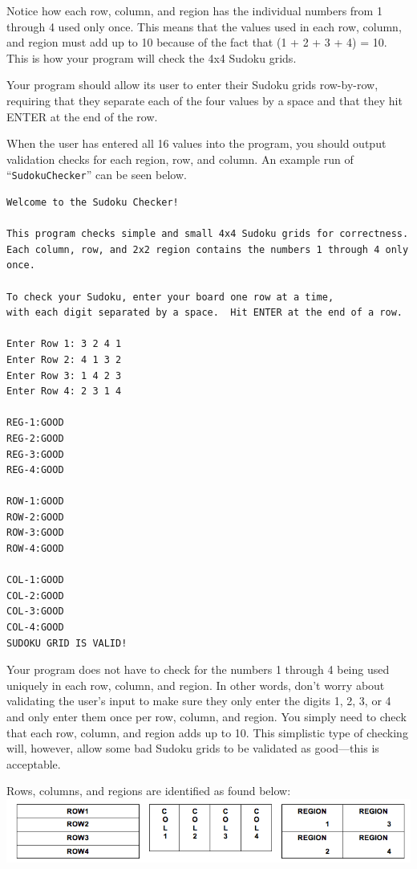 \noindent Notice how each row, column, and region has the individual numbers from 1 through 4 used only once.  This means
that the values used in each row, column, and region must add up to 10 because of the fact that (1 + 2 + 3 + 4) = 10.  This is
how your program will check the 4x4 Sudoku grids.

\noindent Your program should allow its user to enter their Sudoku grids row-by-row, requiring that they separate each
of the four values by a space and that they hit ENTER at the end of the row.

\noindent When the user has entered all 16 values into the program, you should output validation checks for each region,
row, and column.  An example run of ``{\tt SudokuChecker}'' can be seen below.

\vspace*{-.15in}

\begin{verbatim}
Welcome to the Sudoku Checker!

This program checks simple and small 4x4 Sudoku grids for correctness.
Each column, row, and 2x2 region contains the numbers 1 through 4 only once.

To check your Sudoku, enter your board one row at a time,
with each digit separated by a space.  Hit ENTER at the end of a row.

Enter Row 1: 3 2 4 1
Enter Row 2: 4 1 3 2
Enter Row 3: 1 4 2 3
Enter Row 4: 2 3 1 4

REG-1:GOOD
REG-2:GOOD
REG-3:GOOD
REG-4:GOOD

ROW-1:GOOD
ROW-2:GOOD
ROW-3:GOOD
ROW-4:GOOD

COL-1:GOOD
COL-2:GOOD
COL-3:GOOD
COL-4:GOOD
SUDOKU GRID IS VALID!
\end{verbatim}

\newpage

\noindent Your program does not have to check for the numbers 1 through 4 being used uniquely in each row, column, and
region.  In other words, don't worry about validating the user's input to make sure they only enter the digits 1, 2, 3,
or 4 and only enter them once per row, column, and region.  You simply need to check that each row, column, and region
adds up to 10. This simplistic type of checking will, however, allow some bad Sudoku grids to be validated as
good---this is acceptable.

\noindent Rows, columns, and regions are identified as found below:\\

\vspace*{.01in}
\includegraphics[scale=0.5]{sud}


